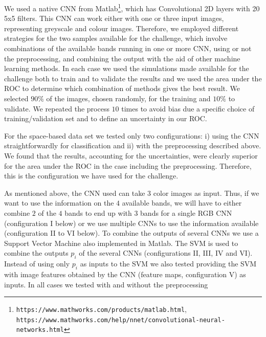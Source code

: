 \documentclass{aa}
\begin{document}
We used a native CNN from Matlab\footnote{\texttt{https://www.mathworks.com/products/matlab.html}, \texttt{https://www.mathworks.com/help/nnet/convolutional-neural-networks.html}}, which has Convolutional 2D layers with 20 5x5 filters. This CNN can work either with one or three input images, representing greyscale and colour images.
Therefore, we employed different strategies for the two samples available for the challenge, which involve combinations of the available bands running in one or more CNN, using or not the preprocessing, and combining the output with the aid of other machine learning methods.
In each case we used the simulations made available for the challenge both to train and to validate the results and we used the area under the ROC to determine which combination of methods gives the best result.    
We selected 
$90\%$ of the images, chosen randomly, for the training and $10\%$ to validate. We repeated the process $10$ times to avoid bias due a specific choice of training/validation set and to define an uncertainty in our ROC.

For the space-based data set we tested only two configurations: i) using the CNN straightforwardly for classification and ii) with the preprocessing described above. 
We found that the results, accounting for the uncertainties,  
were clearly superior for the area under the ROC in the case 
including the preprocessing. Therefore, this is the configuration we have used for the challenge. 

As mentioned above, the CNN used can take 3 color images as input. Thus, if we want to use the information on the $4$ available bands, we will have to either combine $2$ of the $4$ bands to end up with $3$ bands for a single RGB CNN (configuration I below) or we use multiple CNNs to use the information available (configuration II to VI below). To combine the outputs of several CNNs we use a Support Vector Machine \citep[hereafter SVM; see e.g., ][]{rebentrost2014quantum} also implemented in Matlab. The SVM is used to combine the outputs $p_i$ of the several CNNs (configurations II, III, IV and VI). Instead of using only $p_i$ as inputs to the SVM we also tested providing the SVM with image features obtained by the CNN (feature maps, configuration V) as inputs. In all cases we tested with and without the preprocessing
\end{document}
